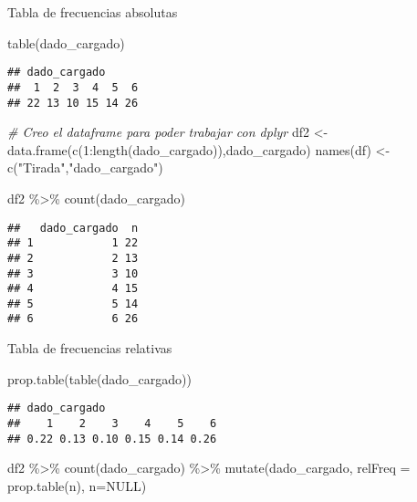 \documentclass[
]{article}
\newenvironment{Shaded}{\begin{snugshade}}{\end{snugshade}}
\newcommand{\AttributeTok}[1]{\textcolor[rgb]{0.77,0.63,0.00}{#1}}
\newcommand{\CommentTok}[1]{\textcolor[rgb]{0.56,0.35,0.01}{\textit{#1}}}
\newcommand{\ConstantTok}[1]{\textcolor[rgb]{0.00,0.00,0.00}{#1}}
\newcommand{\DecValTok}[1]{\textcolor[rgb]{0.00,0.00,0.81}{#1}}
\newcommand{\FunctionTok}[1]{\textcolor[rgb]{0.00,0.00,0.00}{#1}}
\newcommand{\NormalTok}[1]{#1}
\newcommand{\OtherTok}[1]{\textcolor[rgb]{0.56,0.35,0.01}{#1}}
\newcommand{\SpecialCharTok}[1]{\textcolor[rgb]{0.00,0.00,0.00}{#1}}
\newcommand{\StringTok}[1]{\textcolor[rgb]{0.31,0.60,0.02}{#1}}
\begin{document}
Tabla de frecuencias absolutas

\begin{Shaded}
\begin{Highlighting}[]
\FunctionTok{table}\NormalTok{(dado\_cargado)}
\end{Highlighting}
\end{Shaded}

\begin{verbatim}
## dado_cargado
##  1  2  3  4  5  6 
## 22 13 10 15 14 26
\end{verbatim}

\begin{Shaded}
\begin{Highlighting}[]
\CommentTok{\# Creo el dataframe para poder trabajar con dplyr}
\NormalTok{df2 }\OtherTok{\textless{}{-}} \FunctionTok{data.frame}\NormalTok{(}\FunctionTok{c}\NormalTok{(}\DecValTok{1}\SpecialCharTok{:}\FunctionTok{length}\NormalTok{(dado\_cargado)),dado\_cargado)}
\FunctionTok{names}\NormalTok{(df) }\OtherTok{\textless{}{-}} \FunctionTok{c}\NormalTok{(}\StringTok{"Tirada"}\NormalTok{,}\StringTok{"dado\_cargado"}\NormalTok{)}

\NormalTok{df2 }\SpecialCharTok{\%\textgreater{}\%} 
  \FunctionTok{count}\NormalTok{(dado\_cargado)}
\end{Highlighting}
\end{Shaded}

\begin{verbatim}
##   dado_cargado  n
## 1            1 22
## 2            2 13
## 3            3 10
## 4            4 15
## 5            5 14
## 6            6 26
\end{verbatim}

Tabla de frecuencias relativas

\begin{Shaded}
\begin{Highlighting}[]
\FunctionTok{prop.table}\NormalTok{(}\FunctionTok{table}\NormalTok{(dado\_cargado))}
\end{Highlighting}
\end{Shaded}

\begin{verbatim}
## dado_cargado
##    1    2    3    4    5    6 
## 0.22 0.13 0.10 0.15 0.14 0.26
\end{verbatim}

\begin{Shaded}
\begin{Highlighting}[]
\NormalTok{      df2 }\SpecialCharTok{\%\textgreater{}\%} 
        \FunctionTok{count}\NormalTok{(dado\_cargado) }\SpecialCharTok{\%\textgreater{}\%}
          \FunctionTok{mutate}\NormalTok{(dado\_cargado, }\AttributeTok{relFreq =} \FunctionTok{prop.table}\NormalTok{(n), }\AttributeTok{n=}\ConstantTok{NULL}\NormalTok{)}
\end{Highlighting}
\end{Shaded}
\end{document}
